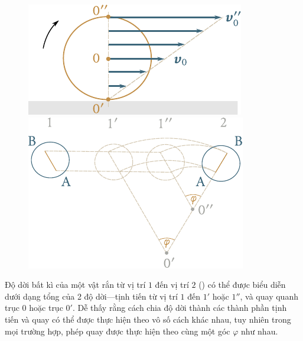 \begin{figure}[!htb]
	\begin{minipage}[t]{0.5\linewidth}
		\begin{center}
			\includegraphics[scale=0.95]{figures/ch_05/fig_5_1.pdf}
			\caption[]{}
			\label{fig:5_1}
		\end{center}
	\end{minipage}
	\hspace{-0.05cm}
	\begin{minipage}[t]{0.5\linewidth}
		\begin{center}
			\includegraphics[scale=0.95]{figures/ch_05/fig_5_2.pdf}
			\caption[]{}
			\label{fig:5_2}
		\end{center}
	\end{minipage}
\end{figure}

Độ dời bất kì của một vật rắn từ vị trí $1$ đến vị trí $2$ () có thể được biểu diễn dưới dạng tổng của 2 độ dời---tịnh tiến từ vị trí $1$ đến $1'$ hoặc $1''$, và quay quanh trục $0$ hoặc trục $0'$. Dễ thấy rằng cách chia độ dời thành các thành phần tịnh tiến và quay có thể được thực hiện theo vô số cách khác nhau, tuy nhiên trong mọi trường hợp, phép quay được thực hiện theo cùng một góc $\varphi$ như nhau.

